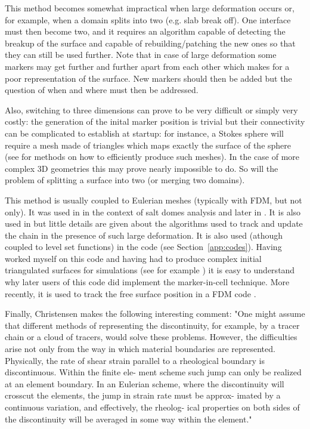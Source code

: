 This method becomes somewhat impractical when large deformation occurs or, for example, 
when a domain splits into two (e.g. slab break off). One interface must then become two, 
and it requires an algorithm capable of detecting the breakup of the surface and capable 
of rebuilding/patching the new ones so that they can still be used further. 
Note that in case of large deformation some markers may get further and further apart 
from each other which makes for a poor representation of the surface. New markers should then 
be added but the question of when and where must then be addressed.

Also, switching to three dimensions can prove to be very difficult or simply very 
costly: the generation of the inital marker position is trivial but their connectivity 
can be complicated to establish at startup: for instance, a Stokes sphere will require
a mesh made of triangles which maps exactly the surface of the sphere (see \cite{thie18,moma19} 
for methods on how to efficiently produce such meshes). In the case of more complex 3D geometries
this may prove nearly impossible to do. So will the problem of splitting a surface into two 
(or merging two domains).  

This method is usually coupled to Eulerian meshes (typically with FDM, but not only). 
It was used in \cite{woid78} in the context of salt domes analysis and later in \cite{chri82,chyu84}.
It is also used in \cite{vaks97} but little details are given about the algorithms used
to track and update the chain in the presence of such large deformation.
It is also used (athough coupled to level set functions) in the \douar code\cite{brtf08} 
(see Section~\ref{app:codes}). Having worked myself on this code and having had to produce 
complex initial triangulated surfaces for simulations (see for example \cite{lobh10}) it is 
easy to understand why later users of this code did implement the marker-in-cell technique.
More recently, it is used to track the free surface position in a FDM code \cite{dumy16,chmd19}.

Finally, Christensen \cite{chri92} makes the following interesting comment:  
"One might assume that different methods 
of representing the discontinuity, for example, by a tracer chain \cite{chyu84} or a cloud of 
tracers, would solve these problems. However, the difficulties 
arise not only from the way in which material boundaries are 
represented. Physically, the rate of shear strain parallel to a 
rheological boundary is discontinuous. Within the finite ele-
ment scheme such jump can only be realized at an element 
boundary. In an Eulerian scheme, where the discontinuity will 
crosscut the elements, the jump in strain rate must be approx- 
imated by a continuous variation, and effectively, the rheolog-
ical properties on both sides of the discontinuity will be 
averaged in some way within the element."

